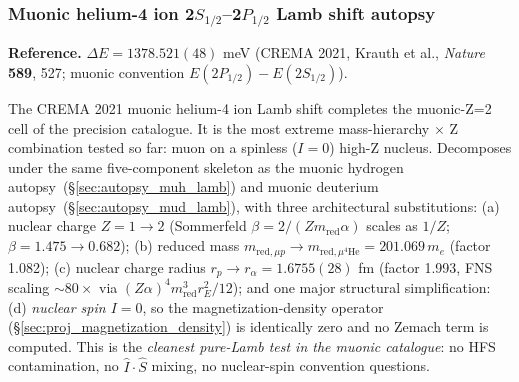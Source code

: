\documentclass[11pt]{article}
\begin{document}
\subsubsection{Muonic helium-4 ion 2$S_{1/2}$--2$P_{1/2}$ Lamb shift autopsy}
\label{sec:autopsy_muhe4_lamb}

\textbf{Reference.} $\Delta E = 1378.521(48)$ meV (CREMA 2021, Krauth
et al., \emph{Nature} \textbf{589}, 527; muonic
convention $E(2P_{1/2}) - E(2S_{1/2})$).

The CREMA 2021 muonic helium-4 ion Lamb shift completes the muonic-Z=2
cell of the precision catalogue.  It is the most extreme mass-hierarchy
$\times$ Z combination tested so far: muon on a spinless ($I=0$)
high-Z nucleus.  Decomposes under the same five-component skeleton
as the muonic hydrogen autopsy~(\S\ref{sec:autopsy_muh_lamb}) and
muonic deuterium autopsy~(\S\ref{sec:autopsy_mud_lamb}), with three
architectural substitutions: (a) nuclear charge $Z = 1 \to 2$
(Sommerfeld $\beta = 2/(Z m_\text{red} \alpha)$ scales as $1/Z$;
$\beta = 1.475 \to 0.682$); (b) reduced mass $m_{\text{red},\mu p} \to
m_{\text{red},\mu^4\text{He}} = 201.069\,m_e$ (factor 1.082);
(c) nuclear charge radius $r_p \to r_\alpha = 1.6755(28)$ fm
(factor 1.993, FNS scaling $\sim 80\times$ via $(Z\alpha)^4
m_\text{red}^3 r_E^2/12$); and one major structural simplification:
(d) \emph{nuclear spin $I = 0$}, so the magnetization-density operator
(\S\ref{sec:proj_magnetization_density}) is identically zero and no
Zemach term is computed.  This is the \emph{cleanest pure-Lamb test
in the muonic catalogue}: no HFS contamination, no $\hat I \cdot \hat S$
mixing, no nuclear-spin convention questions.
\end{document}
